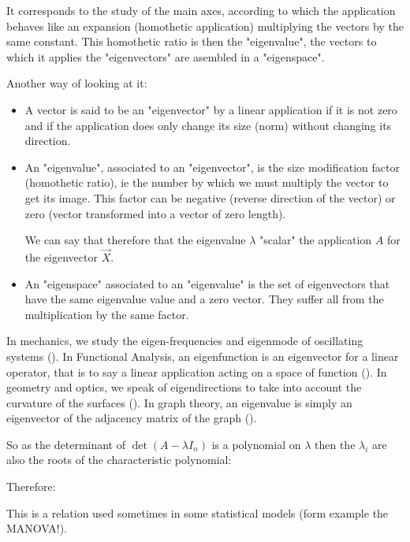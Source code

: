 	It corresponds to the study of the main axes, according to which the application behaves like an expansion (homothetic application) multiplying the vectors by the same constant. This homothetic ratio is then the "eigenvalue", the vectors to which it applies the "eigenvectors" are asembled in a "eigenspace".
	
	Another way of looking at it:
	\begin{itemize}
		\item A vector is said to be an "eigenvector" by a linear application if it is not zero and if the application does only change its size (norm) without changing its direction.

		\item An "eigenvalue", associated to an "eigenvector", is the size modification factor (homothetic ratio), ie the number by which we must multiply the vector to get its image. This factor can be negative (reverse direction of the vector) or zero (vector transformed into a vector of zero length).
		
		We can say that therefore that the eigenvalue $\lambda$ "scalar" the application $A$ for the eigenvector $\vec{X}$.

		\item An "eigenspace" associated to an "eigenvalue" is the set of eigenvectors that have the same eigenvalue value and a zero vector. They suffer all from the multiplication by the same factor.
	\end{itemize}
	\begin{tcolorbox}[title=Remark,colframe=black,arc=10pt]
	In mechanics, we study the eigen-frequencies and eigenmode of oscillating systems (). In Functional Analysis, an eigenfunction is an eigenvector for a linear operator, that is to say a linear application acting on a space of function (). In geometry and optics, we speak of eigendirections to take into account the curvature of the surfaces (). In graph theory, an eigenvalue is simply an eigenvector of the adjacency matrix of the graph ().
	\end{tcolorbox}So as the determinant of $\det(A-\lambda I_n)$ is a polynomial on $\lambda$ then the $\lambda_i$ are also the roots of the characteristic polynomial:
	
	Therefore:
	
	This is a relation used sometimes in some statistical models (form example the MANOVA!). 
	
